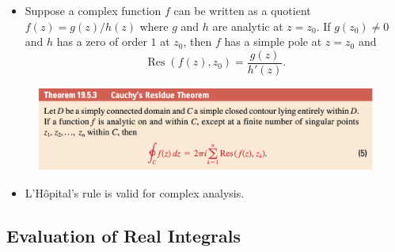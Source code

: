 \documentclass{article}
\newcommand{\Res}{\operatorname{Res}}
\begin{document}
\begin{itemize}
  \item Suppose a complex function $f$ can be written as a quotient $f(z) = g(z) / h(z)$ where $g$ and $h$ are analytic at $z = z_0$. If $g(z_0) \ne 0$ and $h$ has a zero of order $1$ at $z_0$, then $f$ has a simple pole at $z = z_0$ and \[\Res(f(z), z_0) = \frac{g(z)}{h'(z)}.\]
\end{itemize}

\begin{figure}[H]
  \centering
  \includegraphics[width=\textwidth]{cauchys-residue-theorem}
\end{figure}

\begin{itemize}
  \item L'Hôpital's rule is valid for complex analysis.
\end{itemize}

\subsection{Evaluation of Real Integrals}
\end{document}
